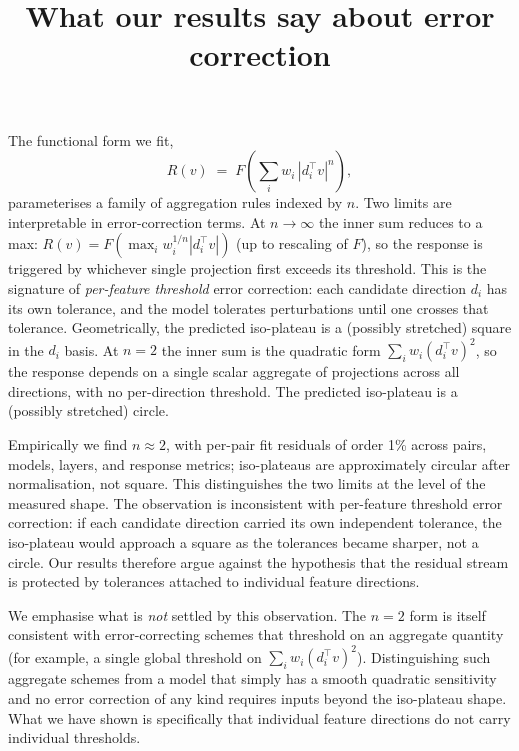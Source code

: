 \documentclass[11pt]{article}
\title{What our results say about error correction}
\date{}
\begin{document}
\maketitle

The functional form we fit,
\[
R(v) \;=\; F\!\left(\sum_i w_i\, |d_i^\top v|^n\right),
\]
parameterises a family of aggregation rules indexed by $n$. Two limits are interpretable in error-correction terms. At $n \to \infty$ the inner sum reduces to a max: $R(v) = F(\max_i w_i^{1/n} |d_i^\top v|)$ (up to rescaling of $F$), so the response is triggered by whichever single projection first exceeds its threshold. This is the signature of \emph{per-feature threshold} error correction: each candidate direction $d_i$ has its own tolerance, and the model tolerates perturbations until one crosses that tolerance. Geometrically, the predicted iso-plateau is a (possibly stretched) square in the $d_i$ basis. At $n = 2$ the inner sum is the quadratic form $\sum_i w_i (d_i^\top v)^2$, so the response depends on a single scalar aggregate of projections across all directions, with no per-direction threshold. The predicted iso-plateau is a (possibly stretched) circle.

Empirically we find $n \approx 2$, with per-pair fit residuals of order 1\% across pairs, models, layers, and response metrics; iso-plateaus are approximately circular after normalisation, not square. This distinguishes the two limits at the level of the measured shape. The observation is inconsistent with per-feature threshold error correction: if each candidate direction carried its own independent tolerance, the iso-plateau would approach a square as the tolerances became sharper, not a circle. Our results therefore argue against the hypothesis that the residual stream is protected by tolerances attached to individual feature directions.

We emphasise what is \emph{not} settled by this observation. The $n = 2$ form is itself consistent with error-correcting schemes that threshold on an aggregate quantity (for example, a single global threshold on $\sum_i w_i (d_i^\top v)^2$). Distinguishing such aggregate schemes from a model that simply has a smooth quadratic sensitivity and no error correction of any kind requires inputs beyond the iso-plateau shape. What we have shown is specifically that individual feature directions do not carry individual thresholds.
\end{document}
